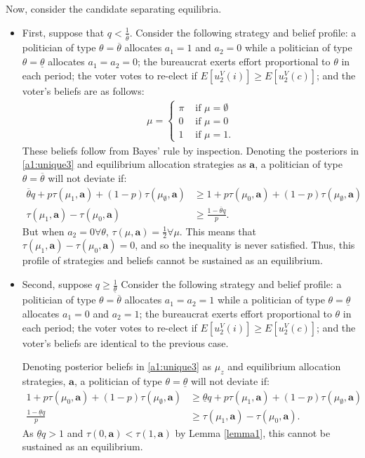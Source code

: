 \documentclass[11pt,english]{article}
\begin{document}
Now, consider the candidate separating equilibria.
\begin{itemize}
 \item First, suppose that $q < \frac{1}{\overline{\theta}}$. Consider the following strategy and belief profile: a politician of type $\theta = \overline{\theta}$ allocates $a_1 = 1$  and $a_2 = 0$ while a politician of type $\theta  = \underline{\theta}$  allocates $a_1 = a_2 = 0$; the bureaucrat exerts effort proportional to $\theta$ in each period; the voter votes to re-elect if $E[u_2^V(i)] \geq E[u_2^V(c)]$; and the voter's beliefs are as follows:
 \begin{align}\label{a1:unique3}
\mu = \begin{cases}
\pi & \text{ if }\mu = \emptyset\\
0 &\text{ if }\mu = 0\\
1 & \text{ if }\mu = 1.
\end{cases}
 \end{align}
These beliefs follow from Bayes' rule by inspection. Denoting the posteriors in \eqref{a1:unique3} and equilibrium allocation strategies as $\boldsymbol{a}$, a politician of type $\theta = \overline{\theta}$ will not deviate if:
\begin{align*}
\overline{\theta}q + p\tau(\mu_1, \boldsymbol{a}) + (1-p)\tau(\mu_\emptyset, \boldsymbol{a}) &\geq 1 +  p\tau(\mu_0, \boldsymbol{a}) + (1-p)\tau(\mu_\emptyset, \boldsymbol{a})\\
\tau(\mu_1, \boldsymbol{a})-\tau(\mu_0, \boldsymbol{a}) &\geq \frac{1-\overline{\theta}q}{p}.
\end{align*}
But when $a_2=0\forall \theta$, $\tau(\mu, \boldsymbol{a}) = \frac{1}{2} \forall \mu$. This means that $\tau(\mu_1, \boldsymbol{a})-\tau(\mu_0, \boldsymbol{a}) = 0$, and so the inequality is never satisfied. Thus, this profile of strategies and beliefs cannot be sustained as an equilibrium. \\
\item Second, suppose $q \geq \frac{1}{\underline{\theta}}$
Consider the following strategy and belief profile: a politician of type $\theta = \overline{\theta}$ allocates $a_1 = a_2 = 1$ while a politician of type $\theta  = \underline{\theta}$  allocates $a_1 = 0$ and  $a_2 = 1$; the bureaucrat exerts effort proportional to $\theta$ in each period; the voter votes to re-elect if $E[u_2^V(i)] \geq E[u_2^V(c)]$; and the voter's beliefs are identical to the previous case.

Denoting posterior beliefs in \eqref{a1:unique3} as $\mu_z$ and equilibrium allocation strategies, $\boldsymbol{a}$, a politician of type $\theta = \underline{\theta}$ will not deviate if:
\begin{align*}
1 + p\tau(\mu_0, \boldsymbol{a}) + (1-p)\tau(\mu_\emptyset, \boldsymbol{a}) &\geq \underline{\theta}q +  p\tau(\mu_1, \boldsymbol{a}) + (1-p)\tau(\mu_\emptyset, \boldsymbol{a})\\
\frac{1-\underline{\theta}q}{p} &\geq \tau(\mu_1, \boldsymbol{a})-\tau(\mu_0, \boldsymbol{a}).
\end{align*}
As $\underline{\theta}q > 1$ and $\tau(0, \boldsymbol{a}) < \tau(1, \boldsymbol{a})$ by Lemma \ref{lemma1}, this cannot be sustained as an equilibrium. 
\end{itemize} 
\end{document}
